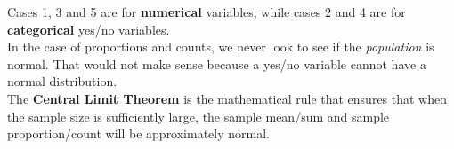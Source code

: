 \noindent Cases 1, 3 and 5 are for \textbf{numerical} variables, while cases 2 and 4 are for \textbf{categorical} yes/no variables.\\[\chdistvertparagraphspace]
In the case of proportions and counts, we never look to see if the \emph{population} is normal.  That would not make sense because a yes/no variable cannot have a normal distribution.\\[\chdistvertparagraphspace]
The \textbf{Central Limit Theorem} is the mathematical rule that ensures that when the sample size is sufficiently large, the sample mean/sum and sample proportion/count will be approximately normal.  
